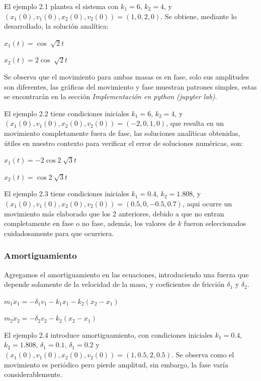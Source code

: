 \documentclass[a4paper]{article}
\begin{document}
El ejemplo 2.1 plantea el sistema con $k_1 = 6$, $k_2 = 4$, y $(x_1(0),v_1(0),x_2(0),v_2(0)) = (1,0,2,0)$. Se obtiene, mediante lo desarrollado, la solución analítica:

\begin{center}
$x_1(t) = \cos \sqrt[]{2} t$

$x_2(t) = 2 \cos \sqrt[]{2} t$
\end{center}

Se observa que el movimiento para ambas masas es en fase, solo sus amplitudes son diferentes, las gráficas del movimiento y fase muestran patrones simples, estas se encontrarán en la sección \textit{Implementación en python (jupyter lab)}.

El ejemplo 2.2 tiene condiciones iniciales $k_1 = 6$, $k_2 = 4$, y $(x_1(0),v_1(0),x_2(0),v_2(0)) = (-2,0,1,0)$, que resulta en un movimiento completamente fuera de fase, las soluciones analíticas obtenidas, útiles en nuestro contexto para verificar el error de soluciones numéricas, son:

\begin{center}
$x_1(t) = -2 \cos 2 \sqrt[]{3} t$

$x_2(t) = \cos 2 \sqrt[]{3} t$
\end{center}

El ejemplo 2.3 tiene condiciones iniciales $k_1 = 0.4$, $k_2 = 1.808$, y $(x_1(0),v_1(0),x_2(0),v_2(0)) = (0.5,0,-0.5,0.7)$, aqui ocurre un movimiento más elaborado que los 2 anteriores, debido a que no entran completamente en fase o no fase, además, los valores de $k$ fueron seleccionados cuidadosamente para que ocurriera.

\subsubsection{Amortiguamiento}

Agregamos el amortiguamiento en las ecuaciones, introduciendo una fuerza que depende solamente de la velocidad de la masa, y coeficientes de fricción ${\delta}_1$ y ${\delta}_2$.

\begin{center}
	$m_1 \ddot{x}_1 = -{\delta}_1 v_1 - k_1 x_1 - k_2 (x_2 - x_1)$

	$m_2 \ddot{x}_2 = -{\delta}_2 v_2 -k_2 (x_2 - x_1)$
\end{center}

El ejemplo 2.4 introduce amortiguamiento, con condiciones iniciales $k_1 = 0.4$, $k_2 = 1.808$, ${\delta}_1 = 0.1$, ${\delta}_1 = 0.2$ y $(x_1(0),v_1(0),x_2(0),v_2(0)) = (1,0.5,2,0.5)$. Se observa como el movimiento es periódico pero pierde amplitud, sin embargo, la fase varía considerablemente.
\end{document}
